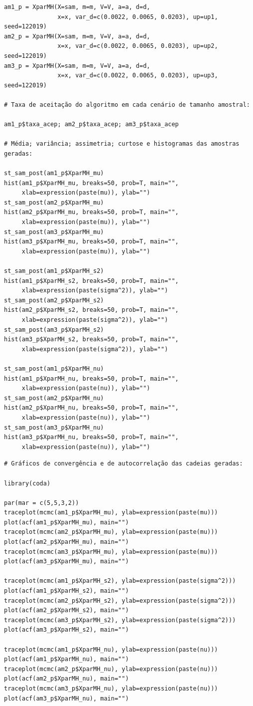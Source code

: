 \documentclass[12pt,reqno,a4paper,oneside]{article}
\begin{document}
\begin{verbatim}
am1_p = XparMH(X=sam, m=m, V=V, a=a, d=d,
			   x=x, var_d=c(0.0022, 0.0065, 0.0203), up=up1, seed=122019)
am2_p = XparMH(X=sam, m=m, V=V, a=a, d=d,
			   x=x, var_d=c(0.0022, 0.0065, 0.0203), up=up2, seed=122019)
am3_p = XparMH(X=sam, m=m, V=V, a=a, d=d,
			   x=x, var_d=c(0.0022, 0.0065, 0.0203), up=up3, seed=122019)

# Taxa de aceitação do algoritmo em cada cenário de tamanho amostral:

am1_p$taxa_acep; am2_p$taxa_acep; am3_p$taxa_acep

# Média; variância; assimetria; curtose e histogramas das amostras geradas:

st_sam_post(am1_p$XparMH_mu)
hist(am1_p$XparMH_mu, breaks=50, prob=T, main="",
	 xlab=expression(paste(mu)), ylab="")
st_sam_post(am2_p$XparMH_mu)
hist(am2_p$XparMH_mu, breaks=50, prob=T, main="",
	 xlab=expression(paste(mu)), ylab="")
st_sam_post(am3_p$XparMH_mu)
hist(am3_p$XparMH_mu, breaks=50, prob=T, main="",
	 xlab=expression(paste(mu)), ylab="")

st_sam_post(am1_p$XparMH_s2)
hist(am1_p$XparMH_s2, breaks=50, prob=T, main="",
	 xlab=expression(paste(sigma^2)), ylab="")
st_sam_post(am2_p$XparMH_s2)
hist(am2_p$XparMH_s2, breaks=50, prob=T, main="",
	 xlab=expression(paste(sigma^2)), ylab="")
st_sam_post(am3_p$XparMH_s2)
hist(am3_p$XparMH_s2, breaks=50, prob=T, main="",
	 xlab=expression(paste(sigma^2)), ylab="")

st_sam_post(am1_p$XparMH_nu)
hist(am1_p$XparMH_nu, breaks=50, prob=T, main="",
	 xlab=expression(paste(nu)), ylab="")
st_sam_post(am2_p$XparMH_nu)
hist(am2_p$XparMH_nu, breaks=50, prob=T, main="",
	 xlab=expression(paste(nu)), ylab="")
st_sam_post(am3_p$XparMH_nu)
hist(am3_p$XparMH_nu, breaks=50, prob=T, main="",
	 xlab=expression(paste(nu)), ylab="")
\end{verbatim}

\newpage

\begin{verbatim}
# Gráficos de convergência e de autocorrelação das cadeias geradas:

library(coda)

par(mar = c(5,5,3,2))
traceplot(mcmc(am1_p$XparMH_mu), ylab=expression(paste(mu)))
plot(acf(am1_p$XparMH_mu), main="")
traceplot(mcmc(am2_p$XparMH_mu), ylab=expression(paste(mu)))
plot(acf(am2_p$XparMH_mu), main="")
traceplot(mcmc(am3_p$XparMH_mu), ylab=expression(paste(mu)))
plot(acf(am3_p$XparMH_mu), main="")

traceplot(mcmc(am1_p$XparMH_s2), ylab=expression(paste(sigma^2)))
plot(acf(am1_p$XparMH_s2), main="")
traceplot(mcmc(am2_p$XparMH_s2), ylab=expression(paste(sigma^2)))
plot(acf(am2_p$XparMH_s2), main="")
traceplot(mcmc(am3_p$XparMH_s2), ylab=expression(paste(sigma^2)))
plot(acf(am3_p$XparMH_s2), main="")

traceplot(mcmc(am1_p$XparMH_nu), ylab=expression(paste(nu)))
plot(acf(am1_p$XparMH_nu), main="")
traceplot(mcmc(am2_p$XparMH_nu), ylab=expression(paste(nu)))
plot(acf(am2_p$XparMH_nu), main="")
traceplot(mcmc(am3_p$XparMH_nu), ylab=expression(paste(nu)))
plot(acf(am3_p$XparMH_nu), main="")
\end{verbatim}
\end{document}
